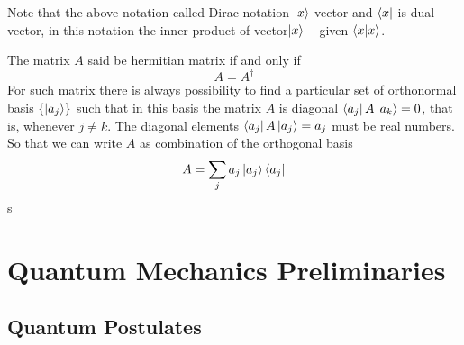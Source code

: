 Note that the above notation called Dirac notation $\ket{x}$ vector and $\bra{x}$ is dual vector, in this notation the inner product of vector$\ket{x}$ ~ given $\bra{x}\ket{x}$.

\begin{defn}\label{DIA}

The matrix $A$ said be hermitian matrix if and only if $$A=A^\dagger$$
 For such matrix there is always possibility to find a particular set of orthonormal basis $\{\ket{a_j}\}$ such that in this basis the matrix $A$ is diagonal $\bra{a_j}A\ket{a_k}=0$, that is,  whenever $j\neq k$. The diagonal elements $\bra{a_j}A\ket{a_j}=a_j$ must be real numbers.
So that we can write $A$ as combination of the orthogonal basis
$$A=\sum_j a_j \ket{a_j} \bra{a_j}$$s
\end{defn}

\section{ Quantum Mechanics Preliminaries }
\subsection{Quantum Postulates}


